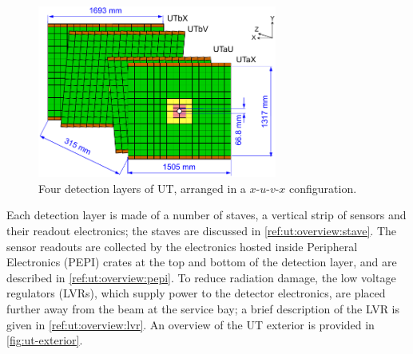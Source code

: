 \begin{figure}[!htb]
    \centering
    \includegraphics[width=0.7\textwidth]{./figs-lhcb-upgrade-overview/tracking/ut_upgrade.pdf}
    \caption{
        Four detection layers of UT,
        arranged in a $x$-$u$-$v$-$x$ configuration.
    }
    \label{fig:ut-layers}
\end{figure}

Each detection layer is made of a number of staves,
a vertical strip of sensors and their readout electronics;
the staves are discussed in \cref{ref:ut:overview:stave}.
The sensor readouts are collected by the electronics hosted inside Peripheral
Electronics (PEPI) crates at the top and bottom of the detection layer,
and are described in \cref{ref:ut:overview:pepi}.
To reduce radiation damage, the low voltage regulators (LVRs),
which supply power to the detector electronics,
are placed further away from the beam at the service bay;
a brief description of the LVR is given in \cref{ref:ut:overview:lvr}.
An overview of the UT exterior is provided in \cref{fig:ut-exterior}.

